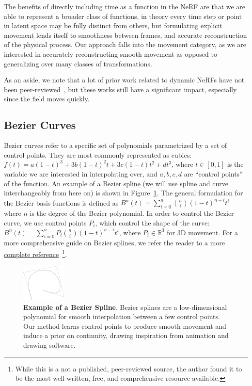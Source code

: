 The benefits of directly including time as a function in the NeRF are that we are able to represent a broader class of functions, in theory every time step or point in latent space may be fully distinct from others, but formulating explicit movement lends itself to smoothness between frames, and accurate reconstruction of the physical process. Our approach falls into the movement category, as we are interested in accurately reconstructing smooth movement as opposed to generalizing over many classes of transformations.

As an aside, we note that a lot of prior work related to dynamic NeRFs have not been peer-reviewed~\cite{pumarola2020dnerf,li2021neural,park2021nerfies,neural3dViewSynthesis}, but these works still have a significant impact, especially since the field moves quickly.

\subsection*{Bezier Curves}
Bezier curves refer to a specific set of polynomials parametrized by a set of control points. They are most commonly represented as cubics: $f(t) = a(1-t)^3 + 3b(1-t)^2t + 3c(1-t)t^2 + dt^3$,
where $t\in[0,1]$ is the variable we are interested in interpolating over, and $a,b,c,d$ are ``control points'' of the function. An example of a Bezier spline (we will use spline and curve interchangeably from here on) is shown in Figure~\ref{fig:bezier_diagram}. The general formulation for
the Bezier basis functions is defined as $B^n(t) = \sum\limits^n_{i=0} {n \choose i} (1-t)^{n-i} t^i$ where $n$
is the degree of the Bezier polynomial. In order to control the Bezier curve, we use control points $P_i$, which control the shape of the curve: $B^n(t) = \sum\limits_{i=0}^n P_i {n \choose i} (1-t)^{n-i} t^i$, where $P_i\in\mathbb{R}^3$ for 3D movement. For a more comprehensive guide on Bezier splines, we refer the reader to a more
\href{https://pomax.github.io/bezierinfo/index.html}{complete reference}~\cite{bezier_primer}\footnote{While this is a not a published, peer-reviewed source, the author found it to be the most well-written, free, and comprehensive resource available.}.

\begin{figure}
    \centering
    \includegraphics[width=0.2\textwidth]{bezier_curve.png}
    \caption{
        \textbf{Example of a Bezier Spline}.
        Bezier splines are a low-dimensional polynomial for smooth interpolation between a few control points. Our method learns control points to produce smooth movement and induce a prior on continuity, drawing inspiration from animation and drawing software.
    }
    \label{fig:bezier_diagram}
\end{figure}

